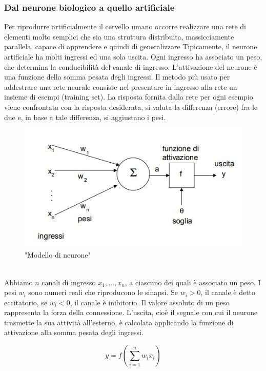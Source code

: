\documentclass[a4paper,11pt]{article}
\begin{document}
    \subsubsection{Dal neurone biologico a quello artificiale}
    Per riprodurre artificialmente il cervello umano occorre realizzare
    una rete di elementi molto semplici che sia una struttura distribuita,
    massicciamente parallela, capace di apprendere e quindi di generalizzare
    Tipicamente, il neurone artificiale ha molti ingressi ed una sola uscita.
    Ogni ingresso ha associato un peso, che determina la conducibilità del
    canale di ingresso. L’attivazione del neurone è una funzione della somma
    pesata degli ingressi. 
    Il metodo più usato per addestrare una rete neurale consiste nel presentare
    in ingresso alla rete un insieme di esempi (training set). La risposta fornita
    dalla rete per ogni esempio viene confrontata con la risposta desiderata, si
    valuta la differenza (errore) fra le due e, in base a tale differenza, si
    aggiustano i pesi.
    \begin{figure}[h]
        \centering
        \includegraphics{neurone.jpg}
        \caption{"Modello di neurone"}
    \end{figure}
    \\Abbiamo $n$ canali di ingresso $x_1, …, x_n$, a ciascuno dei quali è associato un peso. 
    I pesi $w_i$ sono numeri reali che riproducono le sinapsi. Se $w_i > 0$, il canale è detto eccitatorio, se $w_i < 0$, il canale è inibitorio. 
    Il valore assoluto di un peso rappresenta la forza della connessione. 
    L’uscita, cioè il segnale con cui il neurone trasmette la sua attività
    all’esterno, è calcolata applicando la funzione di attivazione alla somma
    pesata degli ingressi. 
    \begin {center}
    $$y = f(\sum_{i=1}^{n}w_i x_i) $$
    \end{center}
\end{document}
